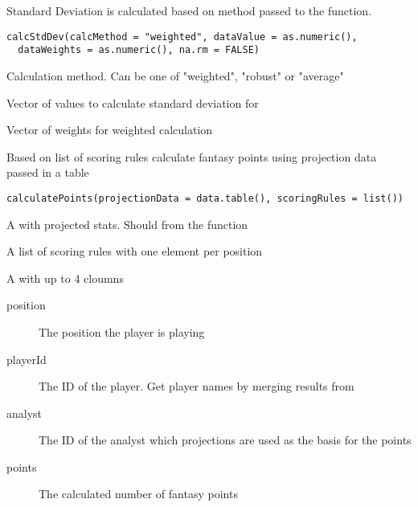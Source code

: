 \documentclass[a4paper]{book}
\begin{document}
%
\begin{Description}\relax
Standard Deviation is calculated based on method passed to the function.
\end{Description}
%
\begin{Usage}
\begin{verbatim}
calcStdDev(calcMethod = "weighted", dataValue = as.numeric(),
  dataWeights = as.numeric(), na.rm = FALSE)
\end{verbatim}
\end{Usage}
%
\begin{Arguments}
\begin{ldescription}
\item[\code{calcMethod}] Calculation method. Can be one of "weighted", "robust" or
"average"

\item[\code{dataValue}] Vector of values to calculate standard deviation for

\item[\code{dataWeights}] Vector of weights for weighted calculation
\end{ldescription}
\end{Arguments}
%
\begin{Description}\relax
Based on list of scoring rules calculate fantasy points using projection data
passed in a table
\end{Description}
%
\begin{Usage}
\begin{verbatim}
calculatePoints(projectionData = data.table(), scoringRules = list())
\end{verbatim}
\end{Usage}
%
\begin{Arguments}
\begin{ldescription}
\item[\code{projectionData}] A  with projected stats.
Should from the  function

\item[\code{scoringRules}] A list of scoring rules with one element per position
\end{ldescription}
\end{Arguments}
%
\begin{Value}
A  with up to 4 cloumns
\begin{description}

\item[position] The position the player is playing
\item[playerId] The ID of the player. Get player names by merging results from
\item[analyst] The ID of the analyst which projections are used as the basis
for the points
\item[points] The calculated number of fantasy points

\end{description}

\end{Value}
\end{document}

